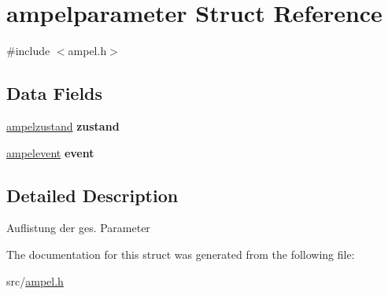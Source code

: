 \hypertarget{structampelparameter}{}\section{ampelparameter Struct Reference}
\label{structampelparameter}


{\ttfamily \#include $<$ampel.\+h$>$}

\subsection*{Data Fields}
\begin{DoxyCompactItemize}
\item 
\hypertarget{structampelparameter_aa3e849a47e5e680b0f4fe0d2d4727126}{}\hyperlink{ampel_8h_a5f4305c91042b570d5d94e83ce6b8012}{ampelzustand} {\bfseries zustand}\label{structampelparameter_aa3e849a47e5e680b0f4fe0d2d4727126}

\item 
\hypertarget{structampelparameter_ad70553c5639d1dbd1db238ba0ede8fc2}{}\hyperlink{ampel_8h_a81b8396a1636de3e1e604ce4935e2f29}{ampelevent} {\bfseries event}\label{structampelparameter_ad70553c5639d1dbd1db238ba0ede8fc2}

\end{DoxyCompactItemize}


\subsection{Detailed Description}
Auflistung der ges. Parameter 

The documentation for this struct was generated from the following file\+:\begin{DoxyCompactItemize}
\item 
src/\hyperlink{ampel_8h}{ampel.\+h}\end{DoxyCompactItemize}
